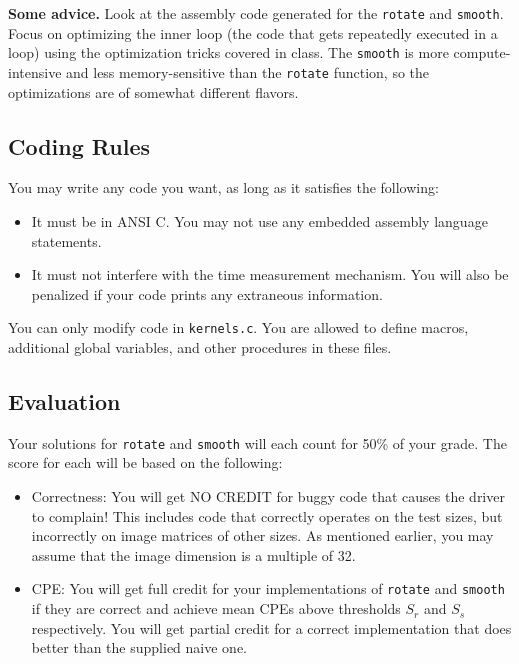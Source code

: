 \documentclass[11pt]{article}
\begin{document}
{\bf Some advice.} Look at the assembly code generated for the
\texttt{rotate} and \texttt{smooth}. Focus on optimizing the inner
loop (the code that gets repeatedly executed in a loop) using the
optimization tricks covered in class.  The \texttt{smooth} is more
compute-intensive and less memory-sensitive than the \texttt{rotate}
function, so the optimizations are of somewhat different flavors.

\subsection*{Coding Rules}
You may write any code you want, as long as it satisfies the following:
\begin{itemize}
\item
It must be in ANSI C.  You may not use any embedded assembly language
statements.
\item
It must not interfere with the time measurement mechanism.  You will
also be penalized if your code prints any extraneous information.
\end{itemize}
You can only modify code in {\tt kernels.c}.  You
are allowed to define macros, additional global variables, and other
procedures in these files.

\subsection*{Evaluation}

Your solutions for {\tt rotate} and {\tt smooth} will each count
for 50\% of your grade. The score for each will be based on the following:
\begin{itemize}

\item Correctness: You will get NO CREDIT for buggy code that causes
the driver to complain! This includes code that correctly operates on
the test sizes, but incorrectly on image matrices of other sizes. As
mentioned earlier, you may assume that the image dimension is a
multiple of 32.

\item CPE: You will get full credit for your implementations of
\texttt{rotate} and \texttt{smooth} if they are correct and achieve
mean CPEs above thresholds $S_r$ and $S_s$
respectively.  You will get partial credit for a correct
implementation that does better than the supplied naive one.
\end{itemize}

\end{document}
